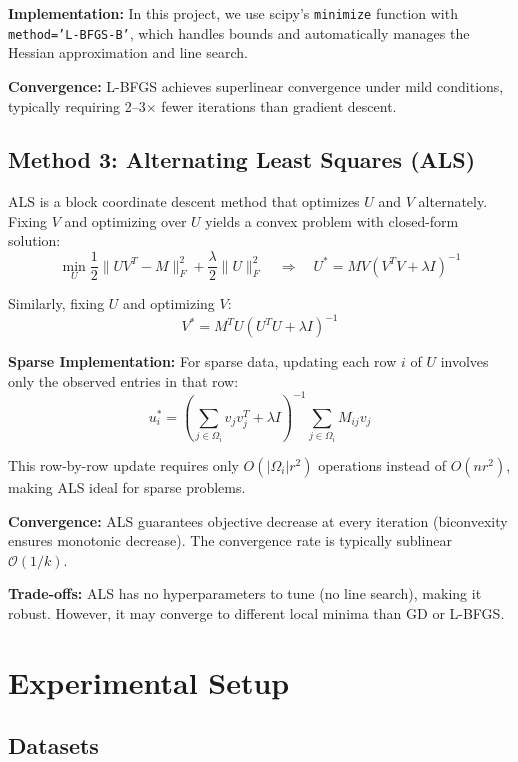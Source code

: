 \documentclass[11pt,a4paper]{article}
\begin{document}
\textbf{Implementation:} In this project, we use scipy's \texttt{minimize} function with \texttt{method='L-BFGS-B'}, which handles bounds and automatically manages the Hessian approximation and line search.

\textbf{Convergence:} L-BFGS achieves superlinear convergence under mild conditions, typically requiring 2--3$\times$ fewer iterations than gradient descent.

\subsection{Method 3: Alternating Least Squares (ALS)}

ALS is a block coordinate descent method that optimizes $U$ and $V$ alternately. Fixing $V$ and optimizing over $U$ yields a convex problem with closed-form solution:
\begin{equation}
\min_U \frac{1}{2}\|UV^T - M\|_F^2 + \frac{\lambda}{2}\|U\|_F^2 
\quad \Rightarrow \quad 
U^* = MV(V^TV + \lambda I)^{-1}
\end{equation}

Similarly, fixing $U$ and optimizing $V$:
\begin{equation}
V^* = M^T U(U^T U + \lambda I)^{-1}
\end{equation}

\textbf{Sparse Implementation:} For sparse data, updating each row $i$ of $U$ involves only the observed entries in that row:
\[
u_i^* = \left(\sum_{j \in \Omega_i} v_j v_j^T + \lambda I\right)^{-1} \sum_{j \in \Omega_i} M_{ij} v_j
\]

This row-by-row update requires only $O(|\Omega_i| r^2)$ operations instead of $O(nr^2)$, making ALS ideal for sparse problems.

\textbf{Convergence:} ALS guarantees objective decrease at every iteration (biconvexity ensures monotonic decrease). The convergence rate is typically sublinear $\mathcal{O}(1/k)$.

\textbf{Trade-offs:} ALS has no hyperparameters to tune (no line search), making it robust. However, it may converge to different local minima than GD or L-BFGS.

\section{Experimental Setup}

\subsection{Datasets}
\end{document}
